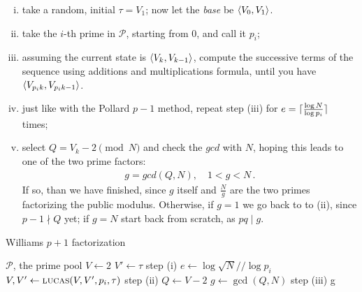 \begin{enumerate}[(i)]
\item take a random, initial $\tau = V_1$; now let the \emph{base} be
  $\langle V_0, V_1\rangle$.
\item take the $i$-th prime in $\mathcal{P}$, starting from $0$, and call it
  $p_i$;
\item assuming the current state is $\langle V_k, V_{k-1}\rangle$, compute the
  successive terms of the sequence using additions and multiplications formula,
  until you have $\langle V_{p_ik}, V_{p_ik - 1}\rangle$.
\item just like with the Pollard $p-1$ method, repeat step (iii) for $e =
  \lceil\frac{\log N}{\log p_i}\rceil$ times;
\item select $Q = V_k - 2 \pmod{N}$ and check the $gcd$ with $N$, hoping this
  leads to one of the two prime factors:
\begin{align}
  g = gcd(Q, N), \quad 1 < g < N \,.
\end{align}
If so, than we have finished, since $g$ itself and $\frac{N}{g}$
are the two primes factorizing the public  modulus.
Otherwise, if $g = 1$ we go back to to (ii), since $p-1 \nmid Q$ yet;
if $g = N$ start back from scratch, as $pq \mid g$.

\end{enumerate}



\begin{algorithm}
  \caption{Williams $p+1$ factorization}
  \begin{algorithmic}[1]
    \Require $\mathcal{P}$, the prime pool
      \State $V \gets 2$
      \State $V' \gets \tau$
      \Comment step (i)
        \State $e \gets \log \sqrt{N} // \log p_i$
          \State $V, V' \gets \textsc{lucas}(V, V', p_i, \tau)$
          \Comment step (ii)
          \State $Q \gets V -2$
          \State $g \gets \gcd(Q, N)$
          \Comment step (iii)
           \Return {}
           \Return g
          \EndIf
        \EndFor
      \EndFor
    \EndFunction
  \end{algorithmic}
\end{algorithm}
